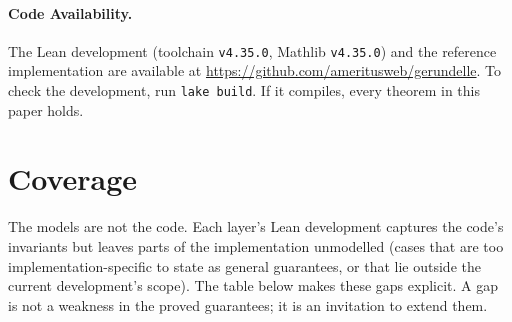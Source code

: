 \documentclass[11pt]{article}
\newcommand{\leanus}{\textunderscore\allowbreak}
\newcommand{\lean}[1]{{\let\_\leanus\texttt{#1}}}
\theoremstyle{remark}
\begin{document}
\paragraph{Code Availability.} The Lean development (toolchain \lean{v4.35.0}, Mathlib
\lean{v4.35.0}) and the reference implementation are available at
\url{https://github.com/ameritusweb/gerundelle}. To check the development, run
\lean{lake build}. If it compiles, every theorem in this paper holds.




\appendix
\section{Coverage}
\label{app:coverage}

The models are not the code. Each layer's Lean development captures the code's invariants
but leaves parts of the implementation unmodelled (cases that are too implementation-specific
to state as general guarantees, or that lie outside the current development's scope). The
table below makes these gaps explicit. A gap is not a weakness in the proved guarantees;
it is an invitation to extend them.
\end{document}
